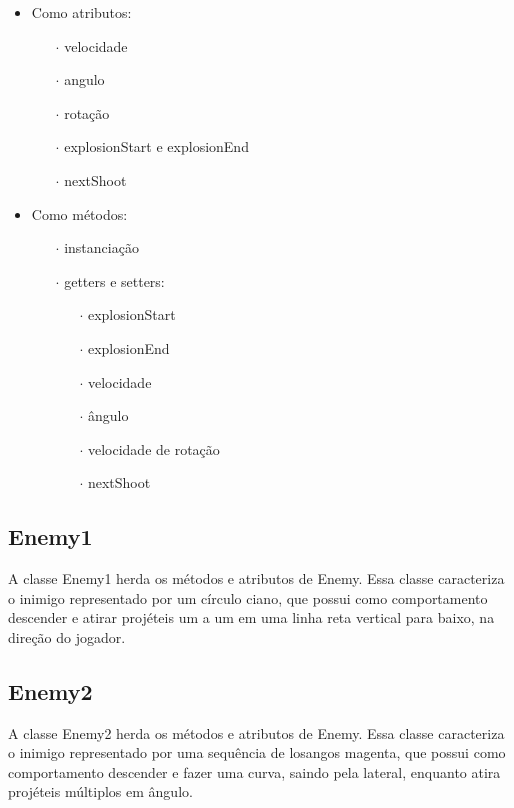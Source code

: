 \documentclass[
	12pt,				%
	oneside,			%
	a4paper,			%
	english,			%
	brazil				%
	]{abntex2ppgsi}
\begin{document}
\begin{itemize}
    \item Como atributos:
    \begin{itemize}
        \item[$\cdot$] velocidade
        \item[$\cdot$] angulo
        \item[$\cdot$] rotação
        \item[$\cdot$] explosionStart e explosionEnd
        \item[$\cdot$] nextShoot
    \end{itemize}
    \item Como métodos:
    \begin{itemize}
        \item[$\cdot$] instanciação
        \item[$\cdot$] getters e setters:
        \begin{itemize}
            \item[$\cdot$] explosionStart
            \item[$\cdot$] explosionEnd
            \item[$\cdot$] velocidade
            \item[$\cdot$] ângulo
            \item[$\cdot$] velocidade de rotação
            \item[$\cdot$] nextShoot
        \end{itemize}
    \end{itemize}
\end{itemize}

\subsection{Enemy1}

A classe Enemy1 herda os métodos e atributos de Enemy. Essa classe caracteriza o inimigo representado por um círculo ciano, que possui como comportamento descender e atirar projéteis um a um em uma linha reta vertical para baixo, na direção do jogador.


\subsection{Enemy2}

A classe Enemy2 herda os métodos e atributos de Enemy. Essa classe caracteriza o inimigo representado por uma sequência de losangos magenta, que possui como comportamento descender e fazer uma curva, saindo pela lateral, enquanto atira projéteis múltiplos em ângulo.
\end{document}

